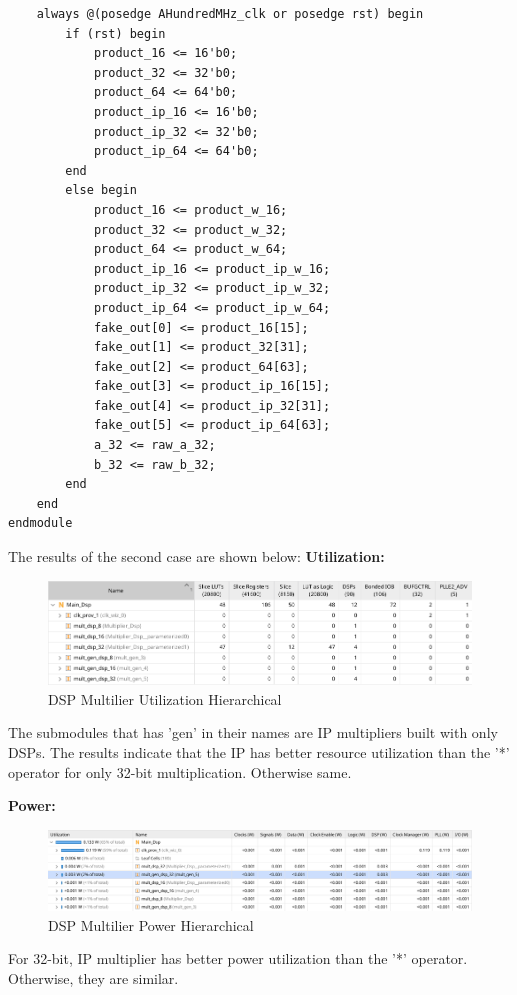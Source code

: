 \documentclass{report}
\begin{document}
\begin{verbatim}
    always @(posedge AHundredMHz_clk or posedge rst) begin
        if (rst) begin
            product_16 <= 16'b0;
            product_32 <= 32'b0;
            product_64 <= 64'b0;
            product_ip_16 <= 16'b0;
            product_ip_32 <= 32'b0;
            product_ip_64 <= 64'b0;
        end
        else begin
            product_16 <= product_w_16;
            product_32 <= product_w_32;
            product_64 <= product_w_64;
            product_ip_16 <= product_ip_w_16;
            product_ip_32 <= product_ip_w_32;
            product_ip_64 <= product_ip_w_64;
            fake_out[0] <= product_16[15];
            fake_out[1] <= product_32[31];
            fake_out[2] <= product_64[63];
            fake_out[3] <= product_ip_16[15];
            fake_out[4] <= product_ip_32[31];
            fake_out[5] <= product_ip_64[63];
            a_32 <= raw_a_32;
            b_32 <= raw_b_32;
        end
    end
endmodule
\end{verbatim}

The results of the second case are shown below:
\textbf{Utilization:}
\begin{figure}[ht]
    \includegraphics[width=1\linewidth]{images/MUL_DSP_Util.png}
    \centering
    \caption{DSP Multilier Utilization Hierarchical}
    \label{fig:dsp_util}
\end{figure}

The submodules that has 'gen' in their names are IP multipliers built with only DSPs. The results indicate that the IP has better resource utilization than the '*' operator for only 32-bit multiplication. Otherwise same.

\break
\textbf{Power:}

\begin{figure}[ht]
    \includegraphics[width=1\linewidth]{images/MUL_DSP_POWER.png}
    \centering
    \caption{DSP Multilier Power Hierarchical}
    \label{fig:dsp_power}
\end{figure}
For 32-bit, IP multiplier has better power utilization than the '*' operator. Otherwise, they are similar.
\end{document}
